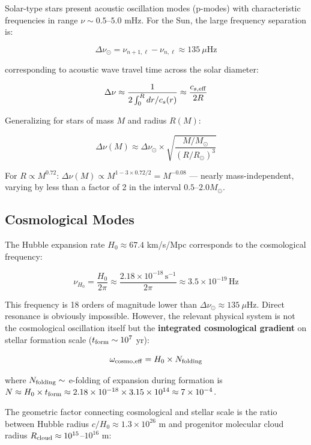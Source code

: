 \documentclass[11pt,a4paper]{article}
\begin{document}
Solar-type stars present acoustic oscillation modes (p-modes) with
characteristic frequencies in range \(\nu \sim 0.5\)--\(5.0\) mHz. For
the Sun, the large frequency separation is:

\[\Delta\nu_\odot = \nu_{n+1,\ell} - \nu_{n,\ell} \approx 135~\mu\mathrm{Hz}\]

corresponding to acoustic wave travel time across the solar diameter:

\[\Delta\nu \approx \frac{1}{2\int_0^R dr/c_s(r)} \approx \frac{c_{s,\rm eff}}{2R}\]

Generalizing for stars of mass \(M\) and radius \(R(M)\):

\[\Delta\nu(M) \approx \Delta\nu_\odot \times \sqrt{\frac{M/M_\odot}{(R/R_\odot)^3}}\]

For \(R \propto M^{0.72}\):
\(\Delta\nu(M) \propto M^{1 - 3\times0.72/2} = M^{-0.08}\) --- nearly
mass-independent, varying by less than a factor of 2 in the interval
\(0.5\)--\(2.0 M_\odot\).

\hypertarget{b.2-cosmological-modes}{%
\subsection*{Cosmological Modes}\label{b.2-cosmological-modes}}

The Hubble expansion rate \(H_0 \approx 67.4\) km/s/Mpc corresponds to
the cosmological frequency:

\[\nu_{H_0} = \frac{H_0}{2\pi} \approx \frac{2.18\times10^{-18}\,\mathrm{s}^{-1}}{2\pi} \approx 3.5\times10^{-19}\,\mathrm{Hz}\]

This frequency is 18 orders of magnitude lower than
\(\Delta\nu_\odot \approx 135~\mu\mathrm{Hz}\). Direct resonance is
obviously impossible. However, the relevant physical system is not the
cosmological oscillation itself but the \textbf{integrated cosmological
gradient} on stellar formation scale (\(t_{\rm form} \sim 10^7\) yr):

\[\omega_{\rm cosmo,eff} = H_0 \times N_{\rm folding}\]

where \(N_{\rm folding} \sim\) e-folding of expansion during formation
is
\(N \approx H_0 \times t_{\rm form} \approx 2.18\times10^{-18} \times 3.15\times10^{14} \approx 7\times10^{-4}\).

The geometric factor connecting cosmological and stellar scale is the
ratio between Hubble radius \(c/H_0 \approx 1.3\times10^{26}\) m and
progenitor molecular cloud radius
\(R_{\rm cloud} \approx 10^{15}\)--\(10^{16}\) m:
\end{document}

